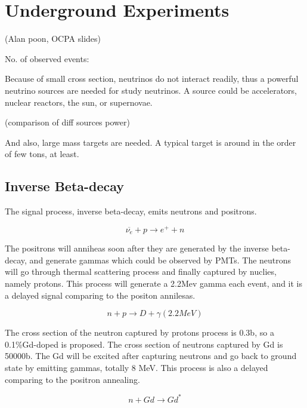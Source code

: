 \section{Underground Experiments}

(Alan poon, OCPA slides)

No. of observed events:

Because of small cross section, neutrinos do not interact readily, thus
a powerful neutrino sources are needed for study neutrinos. A source could be
accelerators, nuclear reactors, the sun, or supernovae.

(comparison of diff sources power)

And also, large mass targets are needed. A typical target is around in the order
of few tons, at least.





\subsection{Inverse Beta-decay}


The signal process, inverse beta-decay, emits neutrons and positrons.


\begin{equation}
\overline{\nu_e} + p \rightarrow e^+ + n
\label{InverseBetaDecay}
\end{equation}


The positrons will anniheas soon after they are generated by the inverse beta-decay,
and generate gammas which could be observed by PMTs. The neutrons will go through
thermal scattering process and finally captured by nuclies, namely protons. This
process will generate a 2.2Mev gamma each event, and it is a delayed signal comparing
to the positon annilesas.


\begin{equation}
n + p \rightarrow D + \gamma (2.2 MeV)
\label{NeutronPCapture}
\end{equation}


The cross section of the neutron captured by protons process is 0.3b, so a 0.1\%Gd-doped
is proposed. The cross section of neutrons captured by Gd is 50000b. The Gd will be excited
after capturing neutrons and go back to ground state by emitting gammas, totally 8 MeV. This
process is also a delayed comparing to the positron annealing.


\begin{equation}
n + Gd \rightarrow Gd^*
\label{NeutronGdCapture}
\end{equation}


